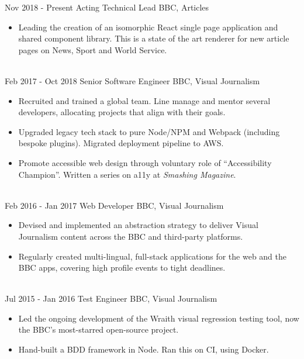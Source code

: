 \documentclass[letterpaper]{twentysecondcv} %
\begin{document}
\begin{twenty} %
    \twentyitem
    	{Nov 2018 -}
		{Present}
        {Acting Technical Lead}
        {BBC, Articles}
        {}
        {
        \begin{itemize}
        \item Leading the creation of an isomorphic React single page application and shared component library. This is a state of the art renderer for new article pages on News, Sport and World Service.
        \end{itemize}
    	}
    \\
    \twentyitem
    	{Feb 2017 -}
		{Oct 2018}
        {Senior Software Engineer}
        {BBC, Visual Journalism}
        {}
        {
        \begin{itemize}
        \item Recruited and trained a global team. Line manage and mentor several developers, allocating projects that align with their goals.
        \item Upgraded legacy tech stack to pure Node/NPM and Webpack (including bespoke plugins). Migrated deployment pipeline to AWS.
        \item Promote accessible web design through voluntary role of ``Accessibility Champion''. Written a series on a11y at \emph{Smashing Magazine}.
        \end{itemize}
    	}
    \\
	\twentyitem
    	{Feb 2016 -}
		{Jan 2017}
        {Web Developer}
        {BBC, Visual Journalism}
        {}
        {
        {\begin{itemize}
        \item Devised and implemented an abstraction strategy to deliver Visual Journalism content across the BBC and third-party platforms.
        \item Regularly created multi-lingual, full-stack applications for the web and the BBC apps, covering high profile events to tight deadlines.
    \end{itemize}}
        }
    \\
    \twentyitem
  		{Jul 2015 -}
		{Jan 2016}
        {Test Engineer}
        {BBC, Visual Journalism}
        {}
        {
        {\begin{itemize}
        \item Led the ongoing development of the Wraith visual regression testing tool, now the BBC's most-starred open-source project.
        \item Hand-built a BDD framework in Node. Ran this on CI, using Docker.

\end{itemize}}}
\end{twenty}
\end{document}
